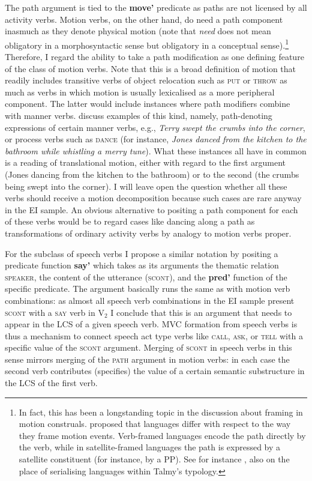 The path argument is tied to the \textbf{move'} predicate as paths are not licensed by all activity verbs. Motion verbs, on the other hand, do need a path component inasmuch as they denote physical motion (note that \emph{need} does not mean obligatory in a morphosyntactic sense but obligatory in a conceptual sense).\footnote{In fact, this has been a longstanding topic in the discussion about framing in motion construals. \citet{talmy1985lexicalization, talmy2000toward} proposed that languages differ with respect to the way they frame motion events. Verb-framed languages encode the path directly by the verb, while in satellite-framed languages the path is expressed by a satellite constituent (for instance, by a PP). See for instance \citet{bohnemeyer2007principles}, also \citet{Ameka2013} on the place of serialising languages within Talmy's typology.} Therefore, I regard the ability to take a path modification as one defining feature of the class of motion verbs. Note that this is a broad definition of motion that readily includes transitive verbs of object relocation such as \textsc{put} or \textsc{throw} as much as verbs in which motion is usually lexicalised as a more peripheral component. The latter would include instances where path modifiers combine with manner verbs. \citet{rappaport1998building} discuss examples of this kind, namely, path-denoting expressions of certain manner verbs, e.g., \textit{Terry swept the crumbs into the corner}, or process verbs such as \textsc{dance} (for instance, \textit{Jones danced from the kitchen to the bathroom while whistling a merry tune}). What these instances all have in common is a reading of translational motion, either with regard to the first argument (Jones dancing from the kitchen to the bathroom) or to the second (the crumbs being swept into the corner). I will leave open the question whether all these verbs should receive a motion decomposition because such cases are rare anyway in the EI sample. An obvious alternative to positing a path component for each of these verbs would be to regard cases like dancing along a path as transformations of ordinary activity verbs by analogy to motion verbs proper.

\largerpage[1]
For the subclass of speech verbs I propose a similar notation by positing a predicate function \textbf{say'} which takes as its arguments the thematic relation \textsc{speaker}, the content of the utterance (\textsc{scont}), and the \textbf{pred'} function of the specific predicate. The argument basically runs the same as with motion verb combinations: as almost all speech verb combinations in the EI sample present \textsc{scont} with a \textsc{say} verb in V$_2$ I conclude that this is an argument that needs to appear in the LCS of a given speech verb. MVC formation from speech verbs is thus a mechanism to connect speech act type verbs like \textsc{call}, \textsc{ask}, or \textsc{tell} with a specific value of the \textsc{scont} argument. Merging of \textsc{scont} in speech verbs in this sense mirrors merging of the \textsc{path} argument in motion verbs: in each case the second verb contributes (specifies) the value of a certain semantic substructure in the LCS of the first verb.

